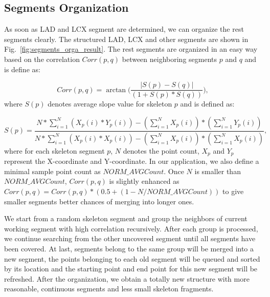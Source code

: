 \documentclass[journal]{IEEEtran}
\begin{document}
\subsection{Segments Organization}
As soon as LAD and LCX segment are determined, we can organize the rest segments clearly. The structured LAD, LCX and other segments are shown in Fig.~\ref{fig:segments_orga_result}. The rest segments are organized in an easy way based on the correlation $Corr(p,q)$ between neighboring segments $p$ and $q$ and is define as:

\begin{equation}
Corr(p,q) = \arctan \Bigg(\frac{|S(p)-S(q)|}{(1+S(p)*S(q))}\Bigg),
\end{equation}
where $S(p)$ denotes average slope value for skeleton $p$ and is defined as:

\begin{equation}
S(p) = \frac{N*\sum\limits_{i=1}^{N}{(X_p(i)*Y_p(i))}-(\sum\limits_{i=1}^{N}{X_p(i)})*(\sum\limits_{i=1}^{N}{Y_p(i)})}
{N*\sum\limits_{i=1}^{N}{(X_p(i)*X_p(i))}-(\sum\limits_{i=1}^{N}{X_p(i)})*(\sum\limits_{i=1}^{N}{X_p(i)})},
\end{equation}
where for each skeleton segment $p$, $N$ denotes the point count, $X_p$ and $Y_p$ represent the X-coordinate and Y-coordinate. In our application, we also define a minimal sample point count as $NORM\_AVGCount$. Once $N$ is smaller than $NORM\_AVGCount$, $Corr(p,q)$ is slightly enhanced as $Corr(p,q) = Corr(p,q)*(0.5+(1-N/NORM\_AVGCount))$ to give smaller segments better chances of merging into longer ones.

We start from a random skeleton segment and group the neighbors of current working segment with high correlation recursively. After each group is processed, we continue searching from the other uncovered segment until all segments have been covered. At last, segments belong to the same group will be merged into a new segment, the points belonging to each old segment will be queued and sorted by its location and the starting point and end point for this new segment will be refreshed. After the organization, we obtain a totally new structure with more reasonable, continuous segments and less small skeleton fragments.
\end{document}
